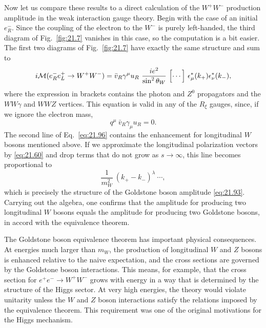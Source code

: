 Now let us compare these results to a direct calculation of the $W^{+}W^{-}$
production amplitude in the weak interaction gauge theory.  Begin with the
case of an initial $e^-_R$.  Since the coupling of the electron to the $W^-$
is purely left-handed, the third diagram of Fig.~\ref{fig:21.7} vanishes in
this case, so the computation is a bit easier.  The first two diagrams of
Fig.~\ref{fig:21.7} have exactly the same structure and sum to
\begin{equation}
  i\mathcal{M}(e^-_Re^+_L \to W^+W^-) = \bar{v}_R\gamma^\mu u_R\ \frac{
    ie^2}{\sin^2\theta_W}\ \Bigl[ \cdots \Bigr]\
    \epsilon^{*}_\mu(k_+)\epsilon^{*}_\nu(k_-) ,
  \label{eq:21.96}
\end{equation}
where the expression in brackets contains the photon and $Z^0$ propagators
and the $WW\gamma$ and $WWZ$ vertices.  This equation is valid in any of
the $R_\xi$ gauges, since, if we ignore the electron mass,
\begin{equation}
  q^\mu\ \bar{v}_R\gamma_\mu u_R = 0 .
  \label{eq:21.97}
\end{equation}
The second line of Eq.~\eqref{eq:21.96} contains the enhancement for
longitudinal $W$ bosons mentioned above.  If we approximate the longitudinal
polarization vectors by \eqref{eq:21.60} and drop terms that do not grow as
$s\to\infty$, this line becomes proportional to
\begin{equation}
  \frac{1}{m_W^2}\ (k_+ - k_-)^\lambda\ \cdots ,
  \label{eq:21.98}
\end{equation}
which is precisely the structure of the Goldstone boson amplitude
\eqref{eq:21.93}.  Carrying out the algebra, one confirms that the amplitude
for producing two longitudinal $W$ bosons equals the amplitude for producing
two Goldstone bosons, in accord with the equivalence theorem.

The Goldstone boson equivalence theorem has important physical consequences.
At energies much larger than $m_W$, the production of longitudinal $W$ and
$Z$ bosons is enhanced relative to the naive expectation, and the cross
sections are governed by the Goldstone boson interactions.  This means, for
example, that the cross section for $e^{+}e^{-}\to W^{+}W^{-}$ grows with
energy in a way that is determined by the structure of the Higgs sector.  At
very high energies, the theory would violate unitarity unless the $W$ and $Z$
boson interactions satisfy the relations imposed by the equivalence theorem.
This requirement was one of the original motivations for the Higgs
mechanism.

